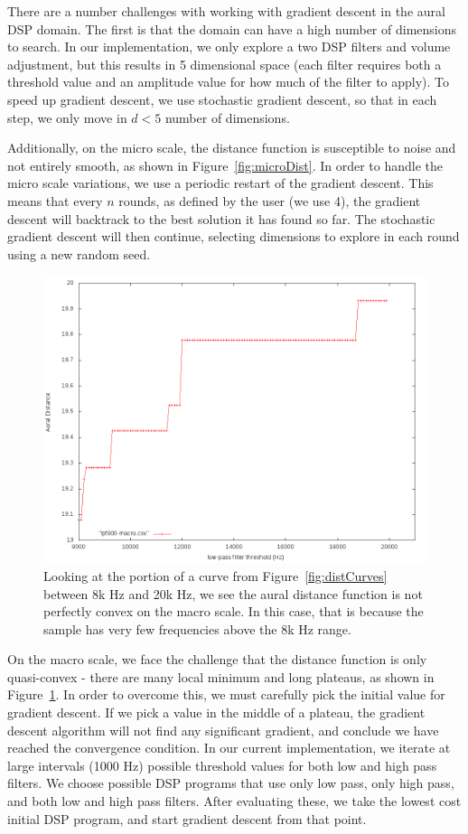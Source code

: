 There are a number challenges with working with gradient descent in the aural DSP domain.
The first is that the domain can have a high number of dimensions to search.
In our implementation, we only explore a two DSP filters and volume adjustment, but this results in 5 dimensional space (each filter requires both a threshold value and an amplitude value for how much of the filter to apply).
To speed up gradient descent, we use stochastic gradient descent, so that in each step, we only move in $d<5$ number of dimensions.

Additionally, on the micro scale, the distance function is susceptible to noise and not entirely smooth, as shown in Figure~\ref{fig:microDist}.
In order to handle the micro scale variations, we use a periodic restart of the gradient descent.
This means that every $n$ rounds, as defined by the user (we use 4), the gradient descent will backtrack to the best solution it has found so far.
The stochastic gradient descent will then continue, selecting dimensions to explore in each round using a new random seed.

\begin{figure}[!h]
\includegraphics[width=\columnwidth]{figs/distCurveMacro} 
\caption{Looking at the portion of a curve from Figure~\ref{fig:distCurves} between 8k Hz and 20k Hz, we see the aural distance function is not perfectly convex on the macro scale. In this case, that is because the sample has very few frequencies above the 8k Hz range.}
\label{fig:macroDist}
\end{figure}

On the macro scale, we face the challenge that the distance function is only quasi-convex - there are many local minimum and long plateaus, as shown in Figure~\ref{fig:macroDist}.
In order to overcome this, we must carefully pick the initial value for gradient descent.
If we pick a value in the middle of a plateau, the gradient descent algorithm will not find any significant gradient, and conclude we have reached the convergence condition.
In our current implementation, we iterate at large intervals (1000 Hz) possible threshold values for both low and high pass filters.
We choose possible DSP programs that use only low pass, only high pass, and both low and high pass filters.
After evaluating these, we take the lowest cost initial DSP program, and start gradient descent from that point.


